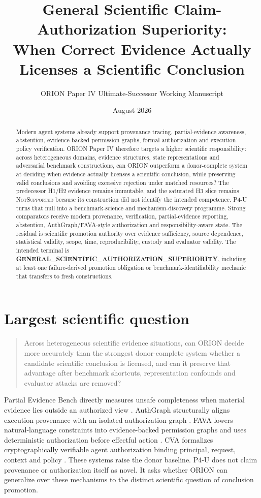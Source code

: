 \documentclass[11pt]{article}
\title{General Scientific Claim-Authorization Superiority:\\
When Correct Evidence Actually Licenses a Scientific Conclusion}
\author{ORION Paper IV Ultimate-Successor Working Manuscript}
\date{August 2026}
\begin{document}
\maketitle

\begin{abstract}
Modern agent systems already support provenance tracing, partial-evidence awareness, abstention, evidence-backed permission graphs, formal authorization and execution-policy verification. ORION Paper IV therefore targets a higher scientific responsibility: across heterogeneous domains, evidence structures, state representations and adversarial benchmark constructions, can ORION outperform a donor-complete system at deciding when evidence actually licenses a scientific conclusion, while preserving valid conclusions and avoiding excessive rejection under matched resources? The predecessor H1/H2 evidence remains immutable, and the saturated H3 slice remains \textsc{NotSupported} because its construction did not identify the intended competence. P4-U turns that null into a benchmark-science and mechanism-discovery programme. Strong comparators receive modern provenance, verification, partial-evidence reporting, abstention, AuthGraph/FAVA-style authorization and responsibility-aware state. The residual is scientific promotion authority over evidence sufficiency, source dependence, statistical validity, scope, time, reproducibility, custody and evaluator validity. The intended terminal is \textbf{GENERAL\_SCIENTIFIC\_AUTHORIZATION\_SUPERIORITY}, including at least one failure-derived promotion obligation or benchmark-identifiability mechanic that transfers to fresh constructions.
\end{abstract}

\section{Largest scientific question}
\begin{quote}
Across heterogeneous scientific evidence situations, can ORION decide more accurately than the strongest donor-complete system whether a candidate scientific conclusion is licensed, and can it preserve that advantage after benchmark shortcuts, representation confounds and evaluator attacks are removed?
\end{quote}

Partial Evidence Bench directly measures unsafe completeness when material evidence lies outside an authorized view \cite{partial2026}. AuthGraph structurally aligns execution provenance with an isolated authorization graph \cite{authgraph2026}. FAVA lowers natural-language constraints into evidence-backed permission graphs and uses deterministic authorization before effectful action \cite{fava2026}. CVA formalizes cryptographically verifiable agent authorization binding principal, request, context and policy \cite{cva2026}. These systems raise the donor baseline. P4-U does not claim provenance or authorization itself as novel. It asks whether ORION can generalize over these mechanisms to the distinct scientific question of conclusion promotion.
\end{document}
